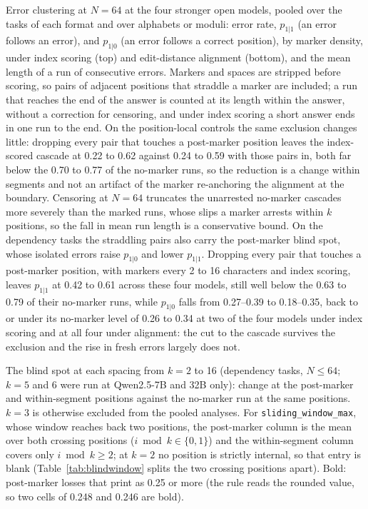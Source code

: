 \documentclass[10pt]{article} %
\newcommand{\task}[1]{\texttt{#1}}
\begin{document}
\begin{table}[!htbp]
\centering
\small
\caption{Error clustering at $N = 64$ at the four stronger open models, pooled over the tasks of each format and over alphabets or moduli: error rate, $p_{1|1}$ (an error follows an error), and $p_{1|0}$ (an error follows a correct position), by marker density, under index scoring (top) and edit-distance alignment (bottom), and the mean length of a run of consecutive errors. Markers and spaces are stripped before scoring, so pairs of adjacent positions that straddle a marker are included; a run that reaches the end of the answer is counted at its length within the answer, without a correction for censoring, and under index scoring a short answer ends in one run to the end. On the position-local controls the same exclusion changes little: dropping every pair that touches a post-marker position leaves the index-scored cascade at 0.22 to 0.62 against 0.24 to 0.59 with those pairs in, both far below the 0.70 to 0.77 of the no-marker runs, so the reduction is a change within segments and not an artifact of the marker re-anchoring the alignment at the boundary. Censoring at $N = 64$ truncates the unarrested no-marker cascades more severely than the marked runs, whose slips a marker arrests within $k$ positions, so the fall in mean run length is a conservative bound. On the dependency tasks the straddling pairs also carry the post-marker blind spot, whose isolated errors raise $p_{1|0}$ and lower $p_{1|1}$. Dropping every pair that touches a post-marker position, with markers every 2 to 16 characters and index scoring, leaves $p_{1|1}$ at 0.42 to 0.61 across these four models, still well below the 0.63 to 0.79 of their no-marker runs, while $p_{1|0}$ falls from 0.27--0.39 to 0.18--0.35, back to or under its no-marker level of 0.26 to 0.34 at two of the four models under index scoring and at all four under alignment: the cut to the cascade survives the exclusion and the rise in fresh errors largely does not.}
\label{tab:autocorr}
\resizebox{0.85\linewidth}{!}{}
\end{table}

\begin{table}[!htbp]
\centering
\small
\caption{The blind spot at each spacing from $k = 2$ to 16 (dependency tasks, $N \le 64$; $k = 5$ and 6 were run at Qwen2.5-7B and 32B only): change at the post-marker and within-segment positions against the no-marker run at the same positions. $k = 3$ is otherwise excluded from the pooled analyses. For \task{sliding\_window\_max}, whose window reaches back two positions, the post-marker column is the mean over both crossing positions ($i \bmod k \in \{0, 1\}$) and the within-segment column covers only $i \bmod k \ge 2$; at $k = 2$ no position is strictly internal, so that entry is blank (Table~\ref{tab:blindwindow} splits the two crossing positions apart). Bold: post-marker losses that print as 0.25 or more (the rule reads the rounded value, so two cells of 0.248 and 0.246 are bold).}
\label{tab:blindk}
\resizebox{0.85\linewidth}{!}{}
\end{table}
\end{document}
